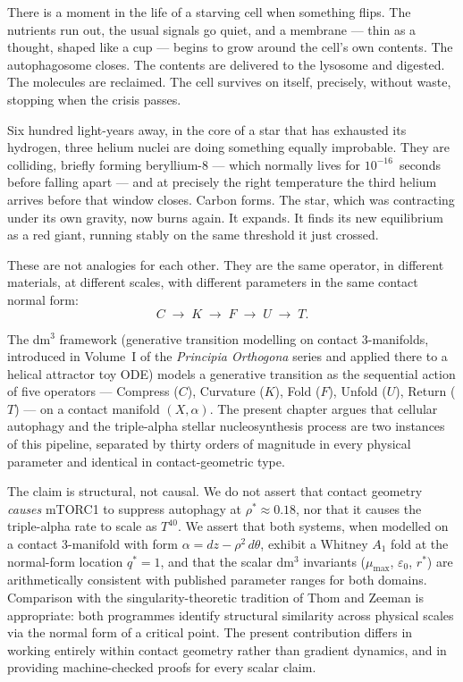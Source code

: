 \documentclass[12pt,a4paper]{article}
\begin{document}
There is a moment in the life of a starving cell when something flips.
The nutrients run out, the usual signals go quiet, and a membrane ---
thin as a thought, shaped like a cup --- begins to grow around the
cell's own contents.
The autophagosome closes.
The contents are delivered to the lysosome and digested.
The molecules are reclaimed.
The cell survives on itself, precisely, without waste, stopping when
the crisis passes.

Six hundred light-years away, in the core of a star that has exhausted
its hydrogen, three helium nuclei are doing something equally improbable.
They are colliding, briefly forming beryllium-8 --- which normally lives
for $10^{-16}$~seconds before falling apart --- and at precisely the
right temperature the third helium arrives before that window closes.
Carbon forms.
The star, which was contracting under its own gravity, now burns again.
It expands.
It finds its new equilibrium as a red giant, running stably on the same
threshold it just crossed.

These are not analogies for each other.
They are the same operator, in different materials, at different scales,
with different parameters in the same contact normal form:
\[
  C \;\longrightarrow\; K \;\longrightarrow\; F
  \;\longrightarrow\; U \;\longrightarrow\; T.
\]

The dm$^3$ framework (generative transition modelling on contact
3-manifolds, introduced in Volume~I of the \textit{Principia Orthogona}
series \cite{Grossi2026_Vol1} and applied there to a helical attractor
toy ODE) models a generative transition as the sequential action of
five operators --- Compress ($C$), Curvature ($K$), Fold ($F$),
Unfold ($U$), Return ($T$) --- on a contact manifold $(X, \alpha)$.
The present chapter argues that cellular autophagy and the triple-alpha
stellar nucleosynthesis process are two instances of this pipeline,
separated by thirty orders of magnitude in every physical parameter
and identical in contact-geometric type.

The claim is structural, not causal.
We do not assert that contact geometry \emph{causes} mTORC1 to suppress
autophagy at $\rho^* \approx 0.18$, nor that it causes the triple-alpha
rate to scale as $T^{40}$.
We assert that both systems, when modelled on a contact 3-manifold with
form $\alpha = dz - \rho^2\,d\theta$, exhibit a Whitney $A_1$ fold at
the normal-form location $q^* = 1$, and that the scalar dm$^3$ invariants
($\mu_{\max}$, $\varepsilon_0$, $r^*$) are arithmetically consistent with
published parameter ranges for both domains.
Comparison with the singularity-theoretic tradition of Thom and Zeeman
\cite{Zeeman1977,Thom1975} is appropriate: both programmes identify
structural similarity across physical scales via the normal form of a
critical point.
The present contribution differs in working entirely within contact
geometry rather than gradient dynamics, and in providing machine-checked
proofs for every scalar claim.
\end{document}

